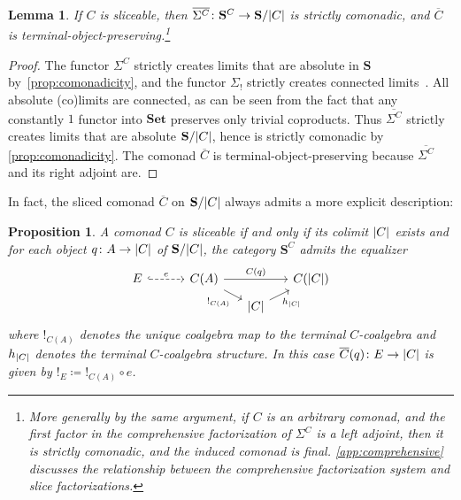 \documentclass[11pt, oneside, article]{memoir}
\theoremstyle{plain}
\newtheorem{proposition}[theorem]{Proposition}
\newtheorem{lemma}[theorem]{Lemma}
\theoremstyle{definition}
\theoremstyle{remark}
\DeclarePairedDelimiter{\abs}{\lvert}{\rvert}
\newcommand{\bang}{\mathrm{!}}
\newcommand{\namedcat}[1]{\mathbf{#1}}
\newcommand{\cat}[1]{\mathbf{#1}}
\newcommand{\Set}{\namedcat{Set}}
\newcommand{\CoalgOn}[2]{{#2}^{#1}}
\newcommand{\CoalgS}[1]{\CoalgOn{#1}{\bS}}
\newcommand{\clift}[1]{\overline{#1}}
\newcommand{\pts}[1]{{\abs{#1}}}
\newcommand{\qpts}[1]{\pts{#1}}
\newcommand{\ptlift}[1]{\overline{#1}}
\newcommand{\carr}{\Sigma}
\newcommand{\slicel}{\Sigma_\bang}
\newcommand{\car}[1]{\carr^{#1}}
\newcommand{\carC}{\car{\cC}}
\newcommand{\cmnd}[1]{{#1}}
\newcommand{\eE}{E}
\newcommand{\xA}{A}
\newcommand{\hH}{h}
\newcommand{\cC}{\cmnd{C}}
\newcommand{\bS}{\cat{S}}
\newcommand{\CS}{\CoalgS{\cC}}
\newcommand{\SC}{\bS/\pts{\cC}}
\newcommand{\qSC}{\bS/\qpts{\cC}}
\newcommand{\final}{terminal-object-preserving}
\begin{document}
\begin{lemma}\label{lem:slicecomonadic}
  If $\cC$ is sliceable, then $\ptlift{\carC} \colon \CS \to \SC$ is
  strictly comonadic, and $\clift{\cC}$ is {\final}.\footnote{More
    generally by the same argument, if $\cC$ is an arbitrary comonad,
    and the first factor in the \emph{comprehensive factorization} of
    $\carC$ is a left adjoint, then it is strictly comonadic, and the
    induced comonad is final. \cref{app:comprehensive} discusses the
    relationship between the comprehensive factorization system and
    slice factorizations.}
\end{lemma}
\begin{proof}
  The functor $\carC$ strictly creates limits that are absolute in
  $\bS$ by~\cref{prop:comonadicity}, and the functor $\slicel$
  strictly creates connected limits~\cite[Proposition
  3.4.8]{riehl}. All absolute (co)limits are connected, as can be seen
  from the fact that any constantly $1$ functor into $\Set$ preserves
  only trivial coproducts. Thus $\ptlift{\carC}$ strictly creates
  limits that are absolute $\qSC$, hence is strictly comonadic by
  \cref{prop:comonadicity}. The comonad $\clift{\cC}$ is {\final}
  because $\ptlift{\carC}$ and its right adjoint are.
\end{proof}

In fact, the sliced comonad $\clift{\cC}$ on $\bS/\pts{\cC}$ always
admits a more explicit description:

\begin{proposition}\label{rem:sliceableformula}
  A comonad $\cC$ is sliceable if and only if its colimit $\pts{\cC}$
  exists and for each object $q \colon \xA \to \pts{\cC}$ of
  $\bS/\pts{\cC}$, the category $\CS$ admits the equalizer
  \[
    \begin{tikzcd}[row sep=5pt,column sep=15pt]
      \eE && {\cC(\xA)} && {\cC(\pts{\cC})} \\
      &&& {\pts{\cC}}
      \arrow["e", dashed, hook, from=1-1, to=1-3]
      \arrow["{{\cC(q)}}", from=1-3, to=1-5]
      \arrow["{\bang_{\cC(\xA)}}"', from=1-3, to=2-4]
      \arrow["\hH_{\pts{\cC}}"', from=2-4, to=1-5]
    \end{tikzcd}
  \]
  where $\bang_{\cC(\xA)}$ denotes the unique coalgebra map to the
  terminal $\cC$-coalgebra and $\hH_{\pts{\cC}}$ denotes the terminal
  $\cC$-coalgebra structure. In this case
  $\clift{\cC}(q) \colon \eE \to \pts{\cC}$ is given by
  $\bang_{\eE} \coloneqq \bang_{\cC(\xA)} \circ e$.
\end{proposition}
\end{document}
